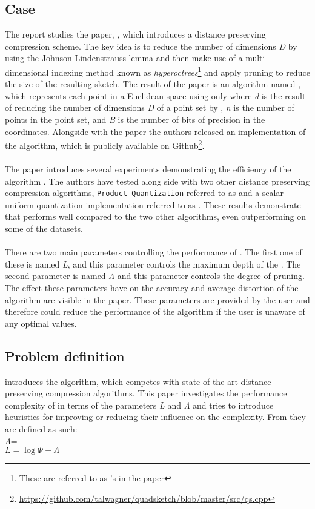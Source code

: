 \subsection{Case} %
The report studies the paper, \cite{wagner17}, which introduces a distance preserving compression scheme. The key idea is to reduce the number of dimensions \textit{D} by using the Johnson-Lindenstrauss lemma and then make use of a multi-dimensional indexing method known as \textit{hyperoctrees}\footnote{These are referred to as \qt{}'s in the paper} and apply pruning to reduce the size of the resulting sketch. The result of the paper is an algorithm named \qs{}, which represents each point in a Euclidean space using only  where \textit{d} is the result of reducing the number of dimensions \textit{D} of a point set by , \textit{n} is the number of points in the point set, and \textit{B} is the number of bits of precision in the coordinates. Alongside with the paper the authors released an implementation of the algorithm, which is publicly available on Github\footnote{\url{https://github.com/talwagner/quadsketch/blob/master/src/qs.cpp}}. 
\\
\\
The paper introduces several experiments demonstrating the efficiency of the algorithm \qs{}. The authors have tested \qs{} along side with two other distance preserving compression algorithms, \texttt{Product Quantization} referred to as \pq{} and a scalar uniform quantization implementation referred to as \gr{}. These results demonstrate that \qs{} performs well compared to the two other algorithms, even outperforming \pq{} on some of the datasets. 
\\
\\
There are two main parameters controlling the performance of \qs{}. The first one of these is named \textit{L}, and this parameter controls the maximum depth of the \qt{}. The second parameter is named $\Lambda$ and this parameter controls the degree of pruning. The effect these parameters have on the accuracy and average distortion of the algorithm are visible in the paper. These parameters are provided by the user and therefore could reduce the performance of the algorithm if the user is unaware of any optimal values.
\subsection{Problem definition} %
\cite{wagner17} introduces the \qs{} algorithm, which competes with state of the art distance preserving compression algorithms. This paper investigates the performance complexity of \qs{} in terms of the parameters \textit{L} and $\Lambda$ and tries to introduce heuristics for improving or reducing their influence on the complexity. From  they are defined as such: \\

$\Lambda$=\\

\ensuremath{L=\log \Phi + \Lambda}

